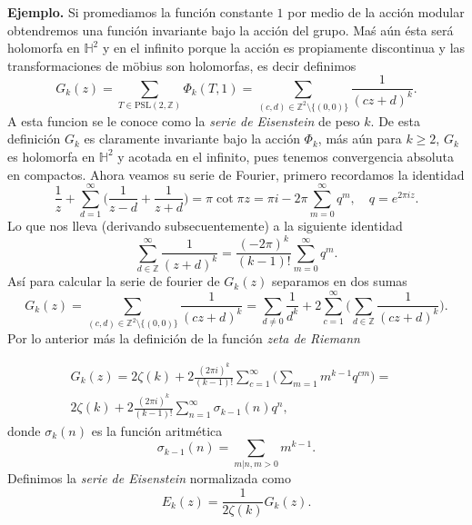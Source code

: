 \documentclass[letterpaper]{article}
\newcommand{\zah}{\ensuremath{ \mathbb Z }}
\newcommand{\eje}{{\noindent \sc \textbf{Ejemplo. }}}
\newcommand{\pslz}{\ensuremath{\mathrm{PSL}(2,\mathbb Z) }}
\newcommand{\hd}{\ensuremath{\mathbb H^2}}
\begin{document}
\eje Si promediamos la función constante \(1\) por medio de la acción modular obtendremos una función invariante bajo la acción del grupo. Maś aún ésta será holomorfa en \(\hd\) y en el infinito porque la acción es propiamente discontinua y las transformaciones de möbius son holomorfas, es decir definimos
\[
    G_k(z)=\sum_{T\in\pslz}\Phi_k(T,1)=\sum_{(c,d)\in\zah^2\setminus\{(0,0)\}}\frac{1}{(cz+d)^k}.
\]
A esta funcion se le conoce como la \emph{serie de Eisenstein} de peso \(k\). De esta definición \(G_k\) es claramente invariante bajo la acción \(\Phi_k\), más aún para \(k\geq2\), \(G_k\) es holomorfa en \(\hd\) y acotada en el infinito, pues tenemos convergencia absoluta en compactos.
Ahora veamos su serie de Fourier, primero recordamos la identidad
\[
 \frac{1}{z}+\sum_{d=1}^{\infty}\Big(\frac{1}{z-d}+\frac{1}{z+d}\Big)=\pi\cot\pi z=\pi i-2\pi\sum_{m=0}^{\infty}q^m,\quad q=e^{2\pi i z}.
\]
Lo que nos lleva (derivando subsecuentemente) a la siguiente identidad
\[
    \sum_{d\in\zah}^{\infty}\frac{1}{(z+d)^{k}}=\frac{(-2\pi)^k}{(k-1)!}\sum_{m=0}^{\infty}q^m.
\]
Así para calcular la serie de fourier de \(G_k(z)\) separamos en dos sumas
\[
  G_k(z)=\sum_{(c,d)\in\zah^2\setminus\{(0,0)\}}\frac{1}{(cz+d)^k}=\sum_{d\neq 0}\frac{1}{d^k}+2\sum_{c=1}^{\infty}\Big(\sum_{d\in\zah}\frac{1}{(cz+d)^k}\Big).
\]
Por lo anterior más la definición de la función \emph{zeta de Riemann}

\begin{align*}
 G_k(z)=2\zeta(k)+2\frac{(2\pi i)^k}{(k-1)!}\sum_{c=1}^{\infty}\Big(\sum_{m=1}m^{k-1}q^{cm}\Big)=\\
2\zeta(k)+2\frac{(2\pi i)^k}{(k-1)!}\sum_{n=1}^{\infty}\sigma_{k-1}(n)q^{n},&
\end{align*}
donde \(\sigma_k(n)\) es la función aritmética
\[
    \sigma_{k-1}(n)=\sum_{m|n,m>0}m^{k-1}.
\]
Definimos la \emph{serie de Eisenstein} normalizada como
\[
    E_k(z)=\frac{1}{2\zeta(k)}G_k(z).
\]
\end{document}
